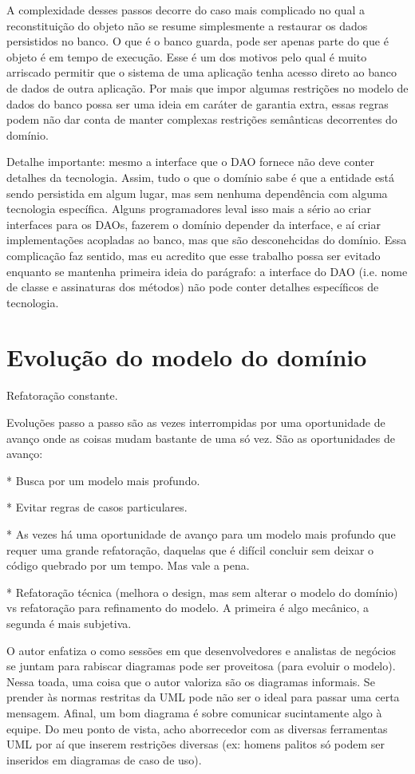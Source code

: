 \documentclass[a4paper, 12pt]{article}
\begin{document}
A complexidade desses passos decorre do caso mais complicado no qual a reconstituição do objeto não se resume simplesmente a restaurar os dados persistidos no banco. O que é o banco guarda, pode ser apenas parte do que é objeto é em tempo de execução. Esse é um dos motivos pelo qual é muito arriscado permitir que o sistema de uma aplicação tenha acesso direto ao banco de dados de outra aplicação. Por mais que impor algumas restrições no modelo de dados do banco possa ser uma ideia em caráter de garantia extra, essas regras podem não dar conta de manter complexas restrições semânticas decorrentes do domínio.

Detalhe importante: mesmo a interface que o DAO fornece não deve conter detalhes da tecnologia. Assim, tudo o que o domínio sabe é que a entidade está sendo persistida em algum lugar, mas sem nenhuma dependência com alguma tecnologia específica. Alguns programadores leval isso mais a sério ao criar interfaces para os DAOs, fazerem o domínio depender da interface, e aí criar implementações acopladas ao banco, mas que são desconehcidas do domínio. Essa complicação faz sentido, mas eu acredito que esse trabalho possa ser evitado enquanto se mantenha primeira ideia do parágrafo: a interface do DAO (i.e. nome de classe e assinaturas dos métodos) não pode conter detalhes específicos de tecnologia.

\section{Evolução do modelo do domínio}




Refatoração constante.

Evoluções passo a passo são as vezes interrompidas por uma oportunidade de avanço onde as coisas mudam bastante de uma só vez. São as oportunidades de avanço: 

* Busca por um modelo mais profundo.

* Evitar regras de casos particulares.

* As vezes há uma oportunidade de avanço para um modelo mais profundo que requer uma grande refatoração, daquelas que é difícil concluir sem deixar o código quebrado por um tempo. Mas vale a pena.

* Refatoração técnica (melhora o design, mas sem alterar o modelo do domínio) vs refatoração para refinamento do modelo. A primeira é algo mecânico, a segunda é mais subjetiva.

O autor enfatiza o como sessões em que desenvolvedores e analistas de negócios se juntam para rabiscar diagramas pode ser proveitosa (para evoluir o modelo). Nessa toada, uma coisa que o autor valoriza são os diagramas informais. Se prender às normas restritas da UML pode não ser o ideal para passar uma certa mensagem. Afinal, um bom diagrama é sobre comunicar sucintamente algo à equipe. Do meu ponto de vista, acho aborrecedor com as diversas ferramentas UML por aí que inserem restrições diversas (ex: homens palitos só podem ser inseridos em diagramas de caso de uso).
\end{document}
